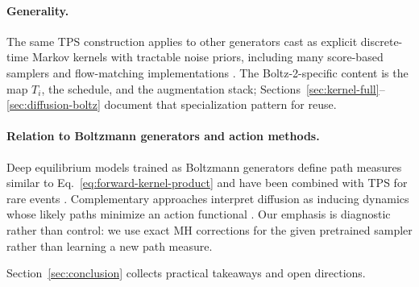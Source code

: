 \paragraph{Generality.}
The same TPS construction applies to other generators cast as explicit
discrete-time Markov kernels with tractable noise priors, including many
score-based samplers and flow-matching implementations \citep{lipman2022}. The
Boltz-2-specific content is the map $T_i$, the schedule, and the augmentation
stack; Sections~\ref{sec:kernel-full}--\ref{sec:diffusion-boltz} document that
specialization pattern for reuse.

\paragraph{Relation to Boltzmann generators and action methods.}
Deep equilibrium models trained as Boltzmann generators define path measures
similar to Eq.~\eqref{eq:forward-kernel-product} and have been combined with TPS
for rare events \citep{falkner2023}. Complementary approaches interpret
diffusion as inducing dynamics whose likely paths minimize an action functional
\citep{raja2025omtps}. Our emphasis is diagnostic rather than control: we use
exact MH corrections for the given pretrained sampler rather than learning a
new path measure.

Section~\ref{sec:conclusion} collects practical takeaways and open directions.
